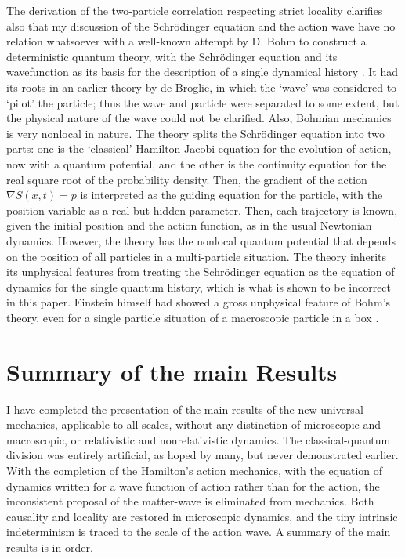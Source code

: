 The derivation of the two-particle correlation respecting strict locality clarifies also that
my discussion of the Schrödinger equation and the action wave have no relation whatsoever
with a well-known attempt by D. Bohm to construct a deterministic quantum theory, with
the Schrödinger equation and its wavefunction as its basis for the description of a single
dynamical history \cite{chap14-key10}. It had its roots in an earlier theory by de Broglie, in which the
‘wave' was considered to `pilot' the particle; thus the wave and particle were separated to
some extent, but the physical nature of the wave could not be clarified. Also, Bohmian
mechanics is very nonlocal in nature. The theory splits the Schr\"{o}dinger equation into two
parts: one is the `classical' Hamilton-Jacobi equation for the evolution of action, now with
a quantum potential, and the other is the continuity equation for the real square root of
the probability density. Then, the gradient of the action $\nabla S(x, t) = p$ is interpreted as the
guiding equation for the particle, with the position variable as a real but hidden parameter.
Then, each trajectory is known, given the initial position and the action function, as in the
usual Newtonian dynamics. However, the theory has the nonlocal quantum potential that
depends on the position of all particles in a multi-particle situation. The theory inherits its
unphysical features from treating the Schr\"{o}dinger equation as the equation of dynamics for
the single quantum history, which is what is shown to be incorrect in this paper. Einstein
himself had showed a gross unphysical feature of Bohm's theory, even for a single particle
situation of a macroscopic particle in a box \cite{chap14-key11}.

\section{Summary of the main Results}\label{c14-sec8}

I have completed the presentation of the main results of the new universal mechanics,
applicable to all scales, without any distinction of microscopic and macroscopic, or relativistic and nonrelativistic dynamics. The classical-quantum division was entirely artificial, as hoped by many, but never demonstrated earlier. With the completion of the Hamilton's action mechanics, with the equation of dynamics written for a wave function of action rather than for the action, the inconsistent proposal of the matter-wave is eliminated from mechanics. Both causality and locality are restored in microscopic dynamics, and the tiny intrinsic indeterminism is traced to the scale of the action wave. A summary of the main results is in order.

